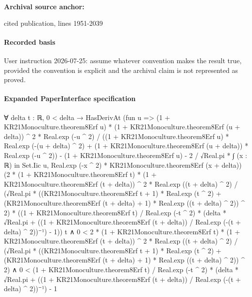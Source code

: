 \documentclass[10pt]{article}
\begin{document}
\textbf{Archival source anchor:} {\footnotesize\raggedright cited publication, lines 1951-\allowbreak{}2039\par}
\paragraph{Recorded basis}
User instruction 2026-\allowbreak{}07-\allowbreak{}25:\allowbreak{} assume whatever convention makes the result true, provided the convention is explicit and the archival claim is not represented as proved.\allowbreak{}
\paragraph{Expanded PaperInterface specification}
\begin{ReviewVerbatim}
∀ {delta t : ℝ},
  0 < delta →
    HasDerivAt
        (fun u =>
          (1 + KR21Monoculture.theorem8Erf u) * (1 + KR21Monoculture.theorem8Erf (u + delta)) ^ 2 * Real.exp (-u ^ 2) /
                ((1 + KR21Monoculture.theorem8Erf u) * Real.exp (-(u + delta) ^ 2) +
                  (1 + KR21Monoculture.theorem8Erf (u + delta)) * Real.exp (-u ^ 2)) -
              (1 + KR21Monoculture.theorem8Erf u) -
            2 / √Real.pi * ∫ (x : ℝ) in Set.Iic u, Real.exp (-x ^ 2) * KR21Monoculture.theorem8Erf (x + delta))
        (2 * (1 + KR21Monoculture.theorem8Erf t) * (1 + KR21Monoculture.theorem8Erf (t + delta)) ^ 2 *
              Real.exp ((t + delta) ^ 2) /
            (√Real.pi *
              ((KR21Monoculture.theorem8Erf t + 1) * Real.exp (t ^ 2) +
                  (KR21Monoculture.theorem8Erf (t + delta) + 1) * Real.exp ((t + delta) ^ 2)) ^
                2) *
          ((1 + KR21Monoculture.theorem8Erf t) / Real.exp (-t ^ 2) *
              (delta * √Real.pi + ((1 + KR21Monoculture.theorem8Erf (t + delta)) / Real.exp (-(t + delta) ^ 2))⁻¹) -
            1))
        t ∧
      0 <
          2 * (1 + KR21Monoculture.theorem8Erf t) * (1 + KR21Monoculture.theorem8Erf (t + delta)) ^ 2 *
              Real.exp ((t + delta) ^ 2) /
            (√Real.pi *
              ((KR21Monoculture.theorem8Erf t + 1) * Real.exp (t ^ 2) +
                  (KR21Monoculture.theorem8Erf (t + delta) + 1) * Real.exp ((t + delta) ^ 2)) ^
                2) ∧
        0 <
          (1 + KR21Monoculture.theorem8Erf t) / Real.exp (-t ^ 2) *
              (delta * √Real.pi + ((1 + KR21Monoculture.theorem8Erf (t + delta)) / Real.exp (-(t + delta) ^ 2))⁻¹) -
            1
\end{ReviewVerbatim}
\end{document}
